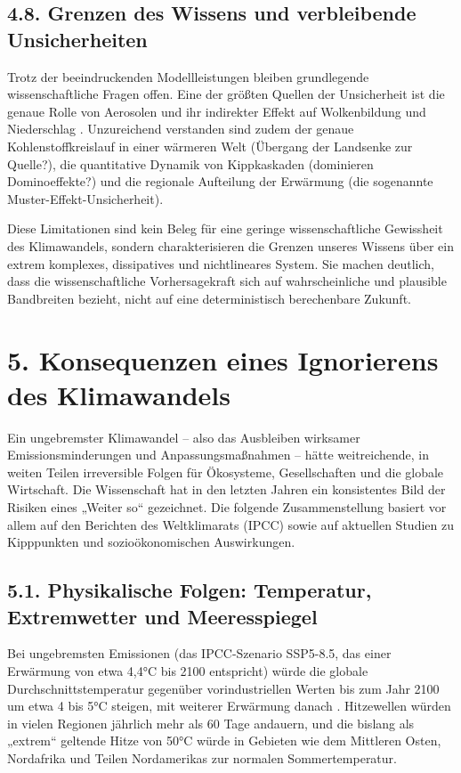\documentclass[12pt, a4paper]{article}
\begin{document}
	\subsection*{4.8. Grenzen des Wissens und verbleibende Unsicherheiten}
	Trotz der beeindruckenden Modellleistungen bleiben grundlegende wissenschaftliche Fragen offen.
	Eine der größten Quellen der Unsicherheit ist die genaue Rolle von Aerosolen und ihr
	indirekter Effekt auf Wolkenbildung und Niederschlag \cite{mpimet2015}. Unzureichend verstanden
	sind zudem der genaue Kohlenstoffkreislauf in einer wärmeren Welt (Übergang der Landsenke zur
	Quelle?), die quantitative Dynamik von Kippkaskaden (dominieren Dominoeffekte?) und die
	regionale Aufteilung der Erwärmung (die sogenannte Muster-Effekt-Unsicherheit).
	
	Diese Limitationen sind kein Beleg für eine geringe wissenschaftliche Gewissheit des
	Klimawandels, sondern charakterisieren die Grenzen unseres Wissens über ein extrem komplexes,
	dissipatives und nichtlineares System. Sie machen deutlich, dass die wissenschaftliche
	Vorhersagekraft sich auf wahrscheinliche und plausible Bandbreiten bezieht, nicht auf eine
	deterministisch berechenbare Zukunft.
	
	\section*{5. Konsequenzen eines Ignorierens des Klimawandels}
	
	Ein ungebremster Klimawandel – also das Ausbleiben wirksamer Emissionsminderungen und
	Anpassungsmaßnahmen – hätte weitreichende, in weiten Teilen irreversible Folgen für
	Ökosysteme, Gesellschaften und die globale Wirtschaft. Die Wissenschaft hat in den letzten
	Jahren ein konsistentes Bild der Risiken eines „Weiter so“ gezeichnet. Die folgende
	Zusammenstellung basiert vor allem auf den Berichten des Weltklimarats (IPCC) sowie auf
	aktuellen Studien zu Kipppunkten und sozioökonomischen Auswirkungen.
	
	\subsection*{5.1. Physikalische Folgen: Temperatur, Extremwetter und Meeresspiegel}
	Bei ungebremsten Emissionen (das IPCC-Szenario SSP5-8.5, das einer Erwärmung von etwa
	4,4°C bis 2100 entspricht) würde die globale Durchschnittstemperatur gegenüber
	vorindustriellen Werten bis zum Jahr 2100 um etwa 4 bis 5°C steigen, mit weiterer Erwärmung
	danach \cite{ipcc2021}. Hitzewellen würden in vielen Regionen jährlich mehr als 60 Tage
	andauern, und die bislang als „extrem“ geltende Hitze von 50°C würde in Gebieten wie dem
	Mittleren Osten, Nordafrika und Teilen Nordamerikas zur normalen Sommertemperatur.
	
\end{document}
